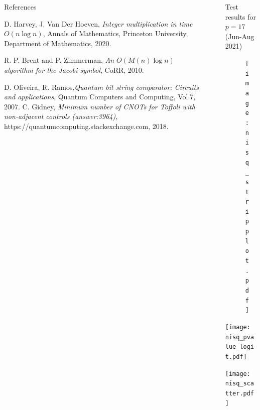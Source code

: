 \documentclass[final]{beamer}
\newlength{\sepwidth}
\newlength{\colwidth}
\newcommand{\separatorcolumn}{\begin{column}{\sepwidth}\end{column}}
\begin{document}
\begin{frame}[t]
\begin{columns}[t]
\begin{column}{\colwidth}
\begin{block}{References}
{\begin{thebibliography}{100}
   D. Harvey, J. Van Der Hoeven, \emph{{Integer multiplication in time $O(n \log n)$}}, {{Annals of Mathematics}}, {{Princeton University, Department of Mathematics}}, 2020.

 R. P. Brent and P. Zimmerman, \emph{An {$O(M(n) \log n)$} algorithm for the Jacobi symbol}, {CoRR}, 2010.

     {D. Oliveira, R. Ramos},\emph{Quantum bit string comparator: Circuits and applications}, {Quantum Computers and Computing}, Vol.7, 2007.
   C. Gidney, \emph{Minimum number of CNOTs for Toffoli with non-adjacent controls (answer:3964)}, {https://quantumcomputing.stackexchange.com}, 2018. 
\end{thebibliography}
}
  \end{block}

\end{column}
\separatorcolumn

\begin{column}{\colwidth}
  \begin{block}{Test results for $p=17$ \hspace{1ex}  (Jun-Aug 2021)}
    \noindent
    \begin{center}
    \vspace*{-5mm}
    \noindent
  \begin{figure}
    \texttt{[image: nisq\_stripplot.pdf]}
  \end{figure}
\vspace{10mm}
    \texttt{[image: nisq\_pvalue\_logit.pdf]}

\vspace{25mm}
\noindent
    \texttt{[image: nisq\_scatter.pdf]}
    \end{center}

  \end{block}



\end{column}
\end{columns}
\end{frame}
\end{document}
